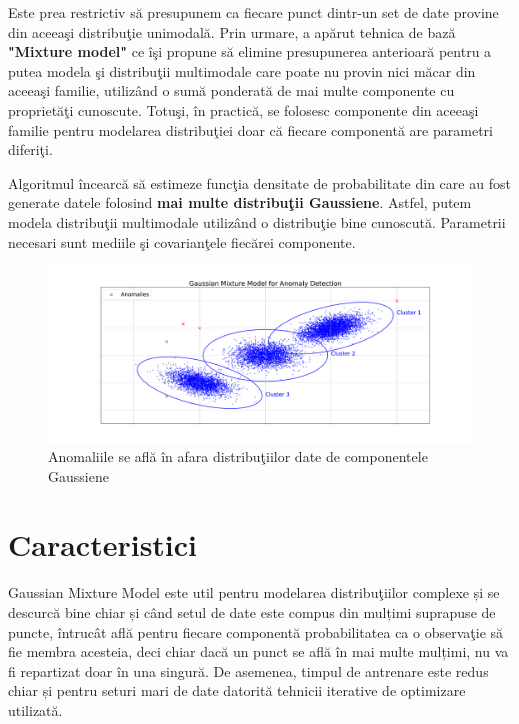 Este prea restrictiv să presupunem ca fiecare punct dintr-un set de date 
provine din aceeaşi distribuţie unimodală. Prin urmare, a apărut tehnica de bază 
\textbf{"Mixture model"} ce îşi propune să elimine presupunerea anterioară pentru 
a putea modela şi distribuţii multimodale care poate nu provin nici măcar din aceeaşi 
familie, utilizând o sumă ponderată de mai multe componente cu proprietăţi
cunoscute. Totuşi, în practică, se folosesc componente din aceeaşi familie pentru 
modelarea distribuţiei doar că fiecare componentă are parametri diferiţi.

Algoritmul încearcă să estimeze funcţia densitate de probabilitate 
din care au fost generate datele folosind 
\textbf{mai multe distribuţii Gaussiene}.
Astfel, putem modela distribuţii multimodale utilizând o distribuţie bine cunoscută.
Parametrii necesari sunt mediile şi covarianţele fiecărei componente.

\begin{figure}[H]
    \centering
    \includegraphics[width=\linewidth]{images/Anomaly-detection-with-Gaussian-mixture-models.pdf}
    \caption{Anomaliile se află în afara distribuţiilor date de componentele Gaussiene}
\end{figure}

\section{Caracteristici}

Gaussian Mixture Model este util pentru modelarea distribuţiilor 
complexe și se descurcă bine chiar și când setul de date 
este compus din mulțimi suprapuse de puncte, întrucât află 
pentru fiecare componentă probabilitatea ca o observaţie
să fie membra acesteia, deci chiar dacă un punct se află 
în mai multe mulțimi, nu va fi repartizat doar în una singură.
De asemenea, timpul de antrenare este redus chiar și pentru 
seturi mari de date datorită tehnicii iterative de optimizare 
utilizată.

